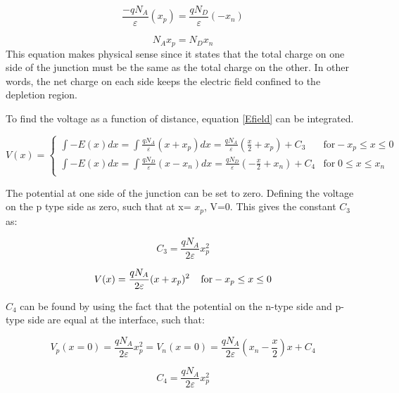 \begin{doublespace}
\begin{equation}
\frac{-qN_{A}}{\varepsilon}(x_{p})=\frac{qN_{D}}{\varepsilon}(-x_{n})
\end{equation}

\begin{equation}
N_{A}x_{p}=N_{D}x_{n}
\label{NAeqND}
\end{equation}This equation makes physical sense since it states that the total charge on one side of the junction must be the same as the total charge on the other. In other words, the net charge on each side keeps the electric field confined to the depletion region.

To find the voltage as a function of distance, equation \ref{Efield} can be integrated.

\begin{equation}
V(x) = \begin{cases}
       \int -E(x)dx=\int \frac{qN_{A}}{\varepsilon}(x+x_{p}) dx = \frac{qN_{A}}{\varepsilon}(\frac{x}{2}+x_{p})+ C_{3} & \text{for}  -x_{p}\leq x \leq 0 \\
       \int -E(x)dx=\int \frac{qN_{D}}{\varepsilon}(x-x_{n}) dx = \frac{qN_{D}}{\varepsilon}(-\frac{x}{2}+x_{n})+ C_{4}  &  \text{for} \; 0 \leq x \leq x_{n}  \\
     \end{cases}
\end{equation}

The potential at one side of the junction can be set to zero. Defining the voltage on the p type side as zero, such that at x= $x_p$, V=0. This gives the constant $C_3$ as:


\begin{equation}
C_{3}=\frac{qN_{A}}{2\varepsilon}x_{p}^{2}
\end{equation}

\begin{equation}
V(x)=\frac{qN_{A}}{2\varepsilon}(x+x_{p})^{2}  \; \; \;\;  \text{for}  -x_{p}\leq x \leq 0 \\
\end{equation}

$C_4$ can be found by using the fact that the potential on the n-type side and p-type side are equal at the interface, such that:

\begin{equation}
V_{p}(x=0)=\frac{qN_{A}}{2\varepsilon}x_{p}^2=V_{n}(x=0)=\frac{qN_{A}}{2\varepsilon}(x_{n}-\frac{x}{2})x+C_{4}
\end{equation}

\begin{equation}
C_{4}=\frac{qN_{A}}{2\varepsilon}x_{p}^2
\end{equation}


\end{doublespace}
